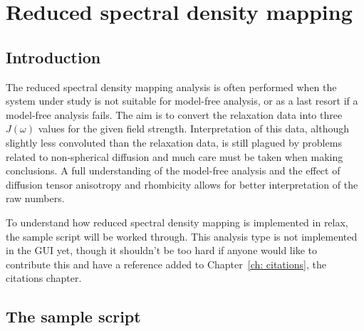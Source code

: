 
\chapter{Reduced spectral density mapping}


\section{Introduction}

The reduced spectral density mapping analysis is often performed when the system under study is not suitable for model-free analysis, or as a last resort if a model-free analysis fails.  The aim is to convert the relaxation data into three $J(\omega)$ values for the given field strength.  Interpretation of this data, although slightly less convoluted than the relaxation data, is still plagued by problems related to non-spherical diffusion and much care must be taken when making conclusions.  A full understanding of the model-free analysis and the effect of diffusion tensor anisotropy and rhombicity allows for better interpretation of the raw numbers.

To understand how reduced spectral density mapping is implemented in relax, the sample script will be worked through.  This analysis type is not implemented in the GUI yet, though it shouldn't be too hard if anyone would like to contribute this and have a reference added to Chapter~\ref{ch: citations}, the citations chapter.



\section{The sample script}

